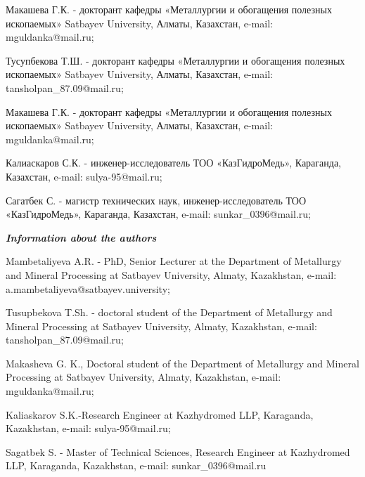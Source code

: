 Макашева Г.К. - докторант кафедры «Металлургии и обогащения полезных
ископаемых» Satbayev University, Алматы, Казахстан, e-mail:
mguldanka@mail.ru;

Тусупбекова Т.Ш. - докторант кафедры «Металлургии и обогащения полезных
ископаемых» Satbayev University, Алматы, Казахстан, e-mail:
tansholpan\_87.09@mail.ru;

Макашева Г.К. - докторант кафедры «Металлургии и обогащения полезных
ископаемых» Satbayev University, Алматы, Казахстан, e-mail:
mguldanka@mail.ru;

Калиаскаров С.К. - инженер-исследователь ТОО «КазГидроМедь», Караганда,
Казахстан, e-mail: sulya-95@mail.ru;

Сагатбек С. - магистр технических наук, инженер-исследователь ТОО
«КазГидроМедь», Караганда, Казахстан, e-mail: sunkar\_0396@mail.ru;

\emph{{\bfseries Information about the authors}}

Mambetaliyeva A.R. - PhD, Senior Lecturer at the Department of
Metallurgy and Mineral Processing at Satbayev University, Almaty,
Kazakhstan, e-mail: a.mambetaliyeva@satbayev.university;

Tusupbekova T.Sh. - doctoral student of the Department of Metallurgy and
Mineral Processing at Satbayev University, Almaty, Kazakhstan, e-mail:
tansholpan\_87.09@mail.ru;

Makasheva G. K., Doctoral student of the Department of Metallurgy and
Mineral Processing at Satbayev University, Almaty, Kazakhstan, e-mail:
mguldanka@mail.ru;

Kaliaskarov S.K.-Research Engineer at Kazhydromed LLP, Karaganda,
Kazakhstan, e-mail: sulya-95@mail.ru;

Sagatbek S. - Master of Technical Sciences, Research Engineer at
Kazhydromed LLP, Karaganda, Kazakhstan, e-mail: sunkar\_0396@mail.ru


